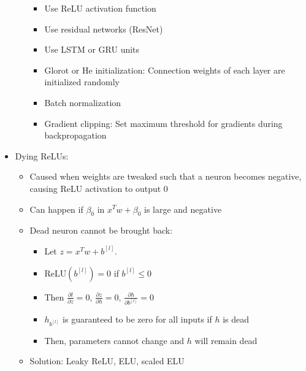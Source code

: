 \begin{itemize}
\begin{itemize}
\begin{itemize}
            \item Use ReLU activation function
            \item Use residual networks (ResNet)
            \item Use LSTM or GRU units
            \item Glorot or He initialization: Connection weights of each layer are initialized randomly
            \item Batch normalization
            \item Gradient clipping: Set maximum threshold for gradients during backpropagation
        \end{itemize}
    \end{itemize}
    \item Dying ReLUs:
    \begin{itemize}
        \item Caused when weights are tweaked such that a neuron becomes negative, causing ReLU activation to output 0
        \item Can happen if $\beta_0$ in $x^T w + \beta_0$ is large and negative
        \item Dead neuron cannot be brought back:
        \begin{itemize}
            \item Let $z = x^T w + b^{[l]}$.
            \item $\text{ReLU} \left( b^{[l]} \right) = 0$ if $b^{[l]} \leq 0$
            \item Then $\frac{\partial l}{\partial z} = 0$, $\frac{\partial z}{\partial h} = 0$, $\frac{\partial h}{\partial b^{[l]}} = 0$
            \item $h_{b^{[l]}}$ is guaranteed to be zero for all inputs if $h$ is dead
            \item Then, parameters cannot change and $h$ will remain dead
        \end{itemize}
        \item Solution: Leaky ReLU, ELU, scaled ELU
    \end{itemize}
\end{itemize}